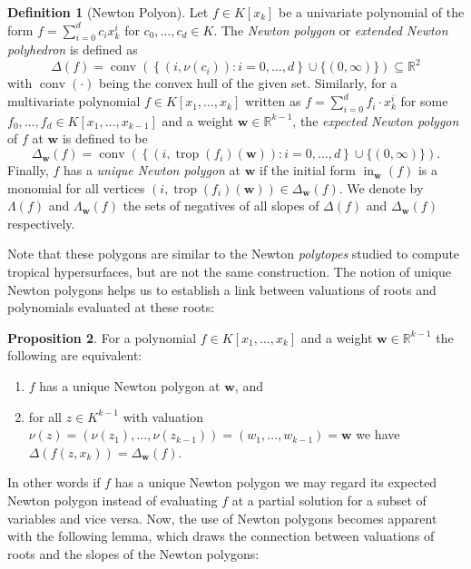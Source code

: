 \documentclass[
  paper=a4,
  titlepage,
  bibliography=totoc,
  pagesize=pdftex
]{scrartcl}
\numberwithin{figure}{section}
\numberwithin{equation}{section}
\numberwithin{table}{section}
\newcommand*\setR{\mathds{R}}
\let\vec\mathbf
\DeclareMathOperator{\trop}{trop}
\DeclareMathOperator{\initial}{in}
\DeclareMathOperator{\conv}{conv}
\theoremstyle{definition}
\newtheorem{definition}{Definition}
\newtheorem{proposition}[definition]{Proposition}
\numberwithin{definition}{section}
\begin{document}
\begin{definition}[Newton Polyon]
  Let $f \in K[x_k]$ be a univariate polynomial of the form $f = \sum_{i=0}^d c_i x_k^i$
  for $c_0, \dots, c_d \in K$. The \emph{Newton polygon} or \emph{extended Newton
  polyhedron} is defined as
  \[
    \Delta(f) = \conv \left(
      \left\{ (i, \nu(c_i)) : i = 0, \dots, d \right\}
      \cup \{ (0, \infty) \}
    \right)
    \subseteq \setR^2
  \]
  with $\conv(\cdot)$ being the convex hull of the given set. Similarly, for a
  multivariate polynomial $f \in K[x_1, \dots, x_k]$ written as $f = \sum_{i=0}^d f_i
  \cdot x_k^i$ for some $f_0, \dots, f_d \in K[x_1, \dots, x_{k-1}]$ and a weight $\vec w
  \in \setR^{k-1}$, the \emph{expected Newton polygon} of $f$ at $\vec w$ is defined to be
  \[
    \Delta_{\vec w}(f) = \conv\left(
      \left\{ (i, \trop(f_i)(\vec w)) : i = 0, \dots, d \right\}
      \cup \{ (0, \infty) \}
    \right).
  \]
  Finally, $f$ has a \emph{unique Newton polygon} at $\vec w$ if the initial form
  $\initial_{\vec w}(f)$ is a monomial for all vertices $(i, \trop(f_i)(\vec w)) \in
  \Delta_{\vec w}(f)$. We denote by $\Lambda(f)$ and $\Lambda_{\vec w}(f)$ the sets of
  negatives of all slopes of $\Delta(f)$ and $\Delta_{\vec w}(f)$ respectively.
  \label{def:newtonPoly}
\end{definition}

Note that these polygons are similar to the Newton \emph{polytopes} studied to compute
tropical hypersurfaces, but are not the same construction. The notion of unique Newton
polygons helps us to establish a link between valuations of roots and polynomials
evaluated at these roots:

\begin{proposition}
  \label{prp:expectedNewt}
  For a polynomial $f \in K[x_1, \dots, x_k]$ and a weight $\vec w \in \setR^{k-1}$ the
  following are equivalent:
  \begin{enumerate}
    \item $f$ has a unique Newton polygon at $\vec w$, and
    \item for all $z \in K^{k-1}$ with valuation $\nu(z) = (\nu(z_1), \dots, \nu(z_{k-1}))
      = (w_1, \dots, w_{k-1}) = \vec w$ we have $\Delta(f(z, x_k)) = \Delta_{\vec w}(f)$.
  \end{enumerate}
\end{proposition}

In other words if $f$ has a unique Newton polygon we may regard its expected Newton
polygon instead of evaluating $f$ at a partial solution for a subset of variables and vice
versa. Now, the use of Newton polygons becomes apparent with the following lemma, which
draws the connection between valuations of roots and the slopes of the Newton polygons:
\end{document}
